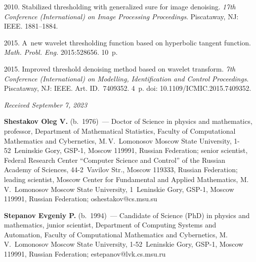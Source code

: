 \begin{multicols}{2}
{{\begin{thebibliography}{99}
 2010. Stabilized thresholding with generalized sure for image denoising. 
 \textit{17th Conference (International) on Image Processing Proceedings}. Piscataway, NJ: IEEE. 1881--1884.

 2015. 
A~new wavelet thresholding function based on hyperbolic tangent function. \textit{Math. Probl. Eng.} 2015:528656. 10~p.

 2015. Improved threshold denoising method based on wavelet transform. 
 \textit{7th Conference (International) on Modelling, Identification and Control Proceedings}. Piscataway, NJ: IEEE. Art. ID.~7409352. 4~p. 
 doi: 10.1109/ICMIC.2015.7409352.
\end{thebibliography}

 }
 }

\end{multicols}

\vspace*{-6pt}

\hfill{\small\textit{Received September 7, 2023}} 


\Contr

\vspace*{-4pt}

\noindent
\textbf{Shestakov Oleg V.} (b.\ 1976)~--- Doctor of Science in physics and mathematics, professor, Department of Mathematical Statistics, 
Faculty of Computational Mathematics and Cybernetics, M.\,V.~Lomonosov Moscow State University, 1-52~Leninskie Gory, GSP-1, 
Moscow 119991, Russian Federation; senior scientist, Federal Research Center ``Computer Science and Control'' 
of the Russian Academy of Sciences, 44-2~Vavilov Str., Moscow 119333, Russian Federation; leading scientist, Moscow Center 
for Fundamental and Applied Mathematics, M.\,V.~Lomonosov Moscow State University, 1~Leninskie Gory, GSP-1, Moscow 119991, Russian Federation; 
\mbox{oshestakov@cs.msu.su}

\vspace*{3pt}

\noindent
\textbf{Stepanov Evgeniy P.} (b.\ 1994)~--- Candidate of Science (PhD) in physics and
mathematics, junior scientist, Department of Computing Systems and Automation, Faculty of
Computational Mathematics and Cybernetics, M.\,V.~Lomonosov Moscow State
University, 1-52~Leninskie Gory, GSP-1, Moscow 119991, Russian Federation;
\mbox{estepanov@lvk.cs.msu.ru}


\label{end\stat}

\renewcommand{\bibname}{\protect\rm Литература} 